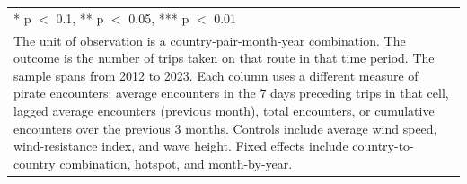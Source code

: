 \begin{table}
\begin{tabular}[t]{lcccc}
\bottomrule
\multicolumn{5}{l}{\rule{0pt}{1em}* p $<$ 0.1, ** p $<$ 0.05, *** p $<$ 0.01}\\
\multicolumn{5}{l}{\rule{0pt}{1em}The unit of observation is a country-pair-month-year combination. The outcome is the number of trips taken on that route in that time period. The sample spans from 2012 to 2023. Each column uses a different measure of pirate encounters: average encounters in the 7 days preceding trips in that cell, lagged average encounters (previous month), total encounters, or cumulative encounters over the previous 3 months. Controls include average wind speed, wind-resistance index, and wave height. Fixed effects include country-to-country combination, hotspot, and month-by-year.}\\
\end{tabular}
\end{table}
